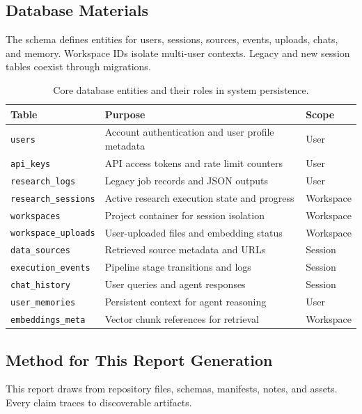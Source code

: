 \documentclass[12pt, a4paper]{article}
\begin{document}
\subsection{Database Materials}

The schema defines entities for users, sessions, sources, events, uploads, chats, and memory.
Workspace IDs isolate multi-user contexts. Legacy and new session tables coexist through migrations.

\begin{table}[H]
\centering
\caption{Core database entities and their roles in system persistence.}
\label{tab:db_entities}
\begin{tabular}{p{4.2cm}|p{7.5cm}|p{1.8cm}}
\toprule
\textbf{Table} & \textbf{Purpose} & \textbf{Scope} \\
\midrule
\texttt{users} & Account authentication and user profile metadata & User \\
\texttt{api\_keys} & API access tokens and rate limit counters & User \\
\texttt{research\_logs} & Legacy job records and JSON outputs & User \\
\texttt{research\_sessions} & Active research execution state and progress & Workspace \\
\texttt{workspaces} & Project container for session isolation & Workspace \\
\texttt{workspace\_uploads} & User-uploaded files and embedding status & Workspace \\
\texttt{data\_sources} & Retrieved source metadata and URLs & Session \\
\texttt{execution\_events} & Pipeline stage transitions and logs & Session \\
\texttt{chat\_history} & User queries and agent responses & Session \\
\texttt{user\_memories} & Persistent context for agent reasoning & User \\
\texttt{embeddings\_meta} & Vector chunk references for retrieval & Workspace \\
\bottomrule
\end{tabular}
\end{table}

\subsection{Method for This Report Generation}

This report draws from repository files, schemas, manifests, notes, and assets. Every claim traces to discoverable artifacts.
\end{document}
